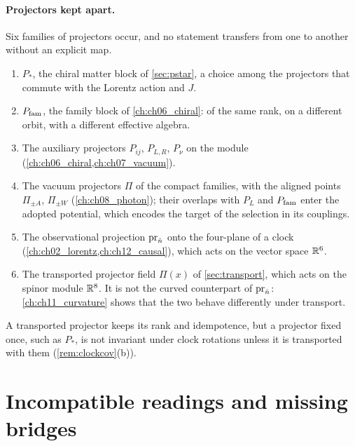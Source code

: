 \paragraph{Projectors kept apart.} Six families of projectors occur, and no statement transfers from one to another without an explicit map.
\begin{enumerate}[label=(\roman*),leftmargin=2.2em]
\item $P_*$, the chiral matter block of \cref{sec:pstar}, a choice among the projectors that commute with the Lorentz action and $J$.
\item $P_{\rm fam}$, the family block of \cref{ch:ch06_chiral}: of the same rank, on a different orbit, with a different effective algebra.
\item The auxiliary projectors $P_{ij}$, $P_{L,R}$, $P_\nu$ on the module (\cref{ch:ch06_chiral,ch:ch07_vacuum}).
\item The vacuum projectors $\Pi$ of the compact families, with the aligned points $\Pi_{\pm A}$, $\Pi_{\pm W}$ (\cref{ch:ch08_photon}); their overlaps with $P_L$ and
$P_{\rm fam}$ enter the adopted potential, which encodes the target of the selection in its couplings.
\item The observational projection $\operatorname{pr}_{\hat n}$ onto the four-plane of a clock (\cref{ch:ch02_lorentz,ch:ch12_causal}), which acts on the vector space $\mathbb{R}^6$.
\item The transported projector field $\Pi(x)$ of \cref{sec:transport}, which acts on the spinor module $\mathbb{R}^8$. It is not the curved counterpart of
$\operatorname{pr}_{\hat n}$: \cref{ch:ch11_curvature} shows that the two behave differently under transport.
\end{enumerate}
A transported projector keeps its rank and idempotence, but a projector fixed once, such as $P_*$, is not invariant under clock rotations
unless it is transported with them (\cref{rem:clockcov}(b)).

\section{Incompatible readings and missing bridges}
\label{sec:incompatible}

